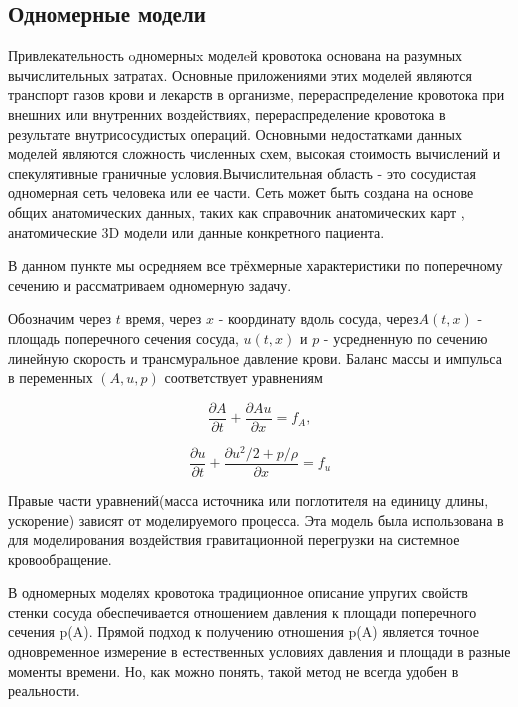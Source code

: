 \subsection{Одномерные модели}

Привлекательность oдномерныx моделeй кровотока основана на разумных вычислительных затратах. Основные приложениями этих моделей являются транспорт газов крови и лекарств в организме, перераспределение кровотока при внешних или внутренних воздействиях, перераспределение кровотока в результате внутрисосудистых операций. Основными недостатками данных моделей являются сложность численных схем, высокая стоимость вычислений и спекулятивные граничные условия.Вычислительная область - это сосудистая одномерная сеть человека или ее части. Сеть может быть создана на основе общих анатомических данных, таких как справочник анатомических карт \cite{bunicheva:2013}, анатомические 3D модели или данные конкретного пациента.

В данном пункте мы осредняем все трёхмерные характеристики по поперечному сечению и рассматриваем одномерную задачу.

Обозначим через $t$ время, через $x$ - координату вдоль сосуда, через$A(t, x)$ - площадь поперечного сечения сосуда, $u(t, x)$ и $p$ - усредненную по сечению линейную скорость и трансмуральное давление крови. Баланс массы и импульса в переменных $(A, u, p)$ соответствует уравнениям

\begin{equation}
	\label{eq:mass-balance}
	\frac{\partial A}{\partial t}+\frac{\partial Au}{\partial x}=f_A,
\end{equation}

\begin{equation}
	\label{eq:momentum-balance}
	\frac{\partial u}{\partial t}+ \frac{\partial u^2/2+p/\rho}{\partial x}=f_u
\end{equation}

Правые части уравнений(масса источника или поглотителя на единицу длины, ускорение) зависят от моделируемого процесса. Эта модель была использована в \cite{bunicheva:2004} для моделирования воздействия гравитационной перегрузки на системное кровообращение. 

В одномерных моделях кровотока традиционное описание упругих свойств стенки сосуда обеспечивается отношением давления к площади поперечного сечения p(A). Прямой подход к получению отношения p(A) является точное одновременное измерение в естественных условиях давления и площади в разные моменты времени. Но, как можно понять, такой метод не всегда удобен в реальности.

